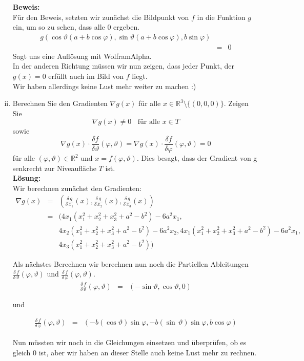 \begin{enumerate}[(i)]
	\textbf{Beweis:}\\
		Für den Beweis, setzten wir zunächst die Bildpunkt von $f$ in die Funktion $g$ ein, um so zu sehen, dass alle $0$ ergeben.\\
		$$\begin{array}{rcl}
			g(\cos \vartheta (a + b \cos \varphi), \sin \vartheta ( a + b \cos \varphi), b \sin \varphi)\\
				&=& 0
		\end{array}$$
		Sagt uns eine Auflösung mit WolframAlpha.\\

		In der anderen Richtung müssen wir nun zeigen, dass jeder Punkt, der $g(x) = 0$ erfüllt auch im Bild von $f$ liegt.\\
		Wir haben allerdings keine Lust mehr weiter zu machen :)
	
	\item Berechnen Sie den Gradienten $\nabla g(x)$ für alle $x \in \mathbb{R}^3 \setminus\{(0,0,0)\}$. Zeigen Sie
		$$
			\nabla g(x) \not= 0 \; \; \text{ für alle } x \in T
		$$
		sowie
		$$
			\nabla g(x) \cdot \frac{\delta f}{\delta \vartheta} (\varphi, \vartheta) = \nabla g(x) \cdot \frac{\delta f}{\delta \varphi} (\varphi, \vartheta
				) = 0
		$$
		für alle $(\varphi, \vartheta) \in \mathbb{R}^2$ und $x = f(\varphi,\vartheta)$. Dies besagt, dass der Gradient von g senkrecht
		zur Niveaufläche $T$ ist.\\
	\textbf{Lösung:}\\
		Wir berechnen zunächst den Gradienten:\\
		$$\begin{array}{rcl}
			\nabla g (x) &=& (\frac{\delta \, g}{\delta \, x_1} (x), \frac{\delta \, g}{\delta \, x_2} (x), \frac{\delta \, g}{\delta \, x_3} (x))\\
				&=& ( 4x_1(x_1^2+x_2^2+x_3^2+a^2-b^2) -6a^2x_1,   \\
			&& 4x_2(x_1^2+x_2^2+x_3^2+a^2-b^2) -6a^2x_2, 4x_1(x_1^2+x_2^2+x_3^2+a^2-b^2) -6a^2x_1,\\
			&& 4x_3(x_1^2+x_2^2+x_3^2+a^2-b^2))
		\end{array}$$

		Als nächstes Berechnen wir berechnen nun noch die Partiellen Ableitungen $\frac{\delta \, f}{\delta \, \vartheta} (\varphi,\vartheta)$ und
		$\frac{\delta \, f}{\delta \, \varphi} (\varphi,\vartheta)$.\\

		$$\begin{array}{rcl}
			\frac{\delta \, f}{\delta \, \vartheta} (\varphi,\vartheta) &=& (- \sin \vartheta, \cos \vartheta , 0)
		\end{array}$$

		und

		$$\begin{array}{rcl}
			\frac{\delta \, f}{\delta \, \varphi} (\varphi,\vartheta) &=&
				( - b (\cos \vartheta ) \sin \varphi, -b (\sin \, \vartheta) \sin \varphi, b \cos \varphi )
		\end{array}$$

		Nun müssten wir noch in die Gleichungen einsetzen und überprüfen, ob es gleich 0 ist, aber wir haben an dieser Stelle auch keine Lust
		mehr zu rechnen.
\end{enumerate}
